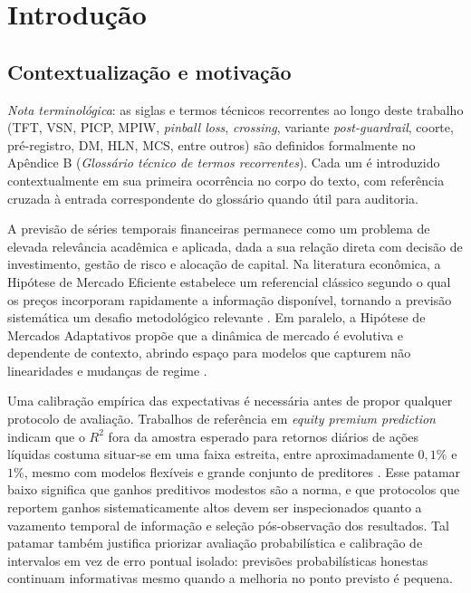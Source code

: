 \chapter{Introdução} \label{chap: Intro}


\section{Contextualização e motivação}
\textit{Nota terminológica}: as siglas e termos técnicos recorrentes ao longo deste trabalho (TFT, VSN, PICP, MPIW, \textit{pinball loss}, \textit{crossing}, variante \textit{post-guardrail}, coorte, pré-registro, DM, HLN, MCS, entre outros) são definidos formalmente no Apêndice B (\textit{Glossário técnico de termos recorrentes}). Cada um é introduzido contextualmente em sua primeira ocorrência no corpo do texto, com referência cruzada à entrada correspondente do glossário quando útil para auditoria.

A previsão de séries temporais financeiras permanece como um problema de elevada relevância acadêmica e aplicada, dada a sua relação direta com decisão de investimento, gestão de risco e alocação de capital. Na literatura econômica, a Hipótese de Mercado Eficiente estabelece um referencial clássico segundo o qual os preços incorporam rapidamente a informação disponível, tornando a previsão sistemática um desafio metodológico relevante \cite{FAMA1991}. Em paralelo, a Hipótese de Mercados Adaptativos propõe que a dinâmica de mercado é evolutiva e dependente de contexto, abrindo espaço para modelos que capturem não linearidades e mudanças de regime \cite{LO2004}.

Uma calibração empírica das expectativas é necessária antes de propor qualquer protocolo de avaliação. Trabalhos de referência em \textit{equity premium prediction} indicam que o \(R^2\) fora da amostra esperado para retornos diários de ações líquidas costuma situar-se em uma faixa estreita, entre aproximadamente \(0{,}1\%\) e \(1\%\), mesmo com modelos flexíveis e grande conjunto de preditores \cite{GU2020,RAPACH2013}. Esse patamar baixo significa que ganhos preditivos modestos são a norma, e que protocolos que reportem ganhos sistematicamente altos devem ser inspecionados quanto a vazamento temporal de informação e seleção pós-observação dos resultados. Tal patamar também justifica priorizar avaliação probabilística e calibração de intervalos em vez de erro pontual isolado: previsões probabilísticas honestas continuam informativas mesmo quando a melhoria no ponto previsto é pequena.

